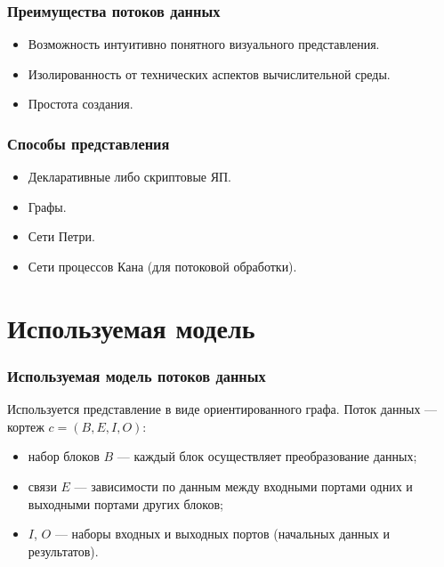\documentclass[10pt,pdf,hyperref={unicode}]{beamer}
\begin{document}
\begin{frame}
  \frametitle{Преимущества потоков данных}
  \begin{itemize}
    \item Возможность интуитивно понятного визуального представления.
    \item Изолированность от технических аспектов вычислительной среды.
    \item Простота создания.
  \end{itemize}
\end{frame}

\begin{frame}
  \frametitle{Способы представления}
  \begin{itemize}
    \item Декларативные либо скриптовые ЯП.
    \item Графы.
    \item Сети Петри.
    \item Сети процессов Кана (для потоковой обработки).
  \end{itemize}
\end{frame}

\section{Используемая модель}

\begin{frame}
  \frametitle{Используемая модель потоков данных}
  Используется представление в виде ориентированного графа.
  Поток данных --- кортеж $c = (B, E, I, O)$:
  \begin{itemize}
    \item набор блоков $B$ --- каждый блок осуществляет преобразование данных;
    \item связи $E$ --- зависимости по данным между входными портами одних и выходными портами других блоков;
    \item $I$, $O$ --- наборы входных и выходных портов (начальных данных и результатов).
  \end{itemize}
\end{frame}
\end{document}
